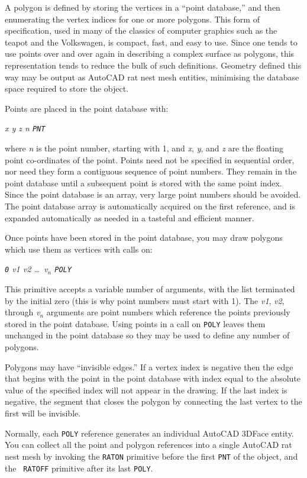 \documentclass{article}
\begin{document}
A polygon is defined by storing the vertices in a ``point database,''
and then enumerating the vertex indices for one or more polygons.
This form of specification, used in many of the classics of computer
graphics such as the teapot and the Volkswagen, is compact, fast, and
easy to use.  Since one tends to use points over and over again in
describing a complex surface as polygons, this representation tends to
reduce the bulk of such definitions.  Geometry defined this way may be
output as AutoCAD rat nest mesh entities, minimising the database
space required to store the object.

Points are placed in the point database with:

{\em x y z n {\tt PNT}}

where {\em n} is the point number, starting with 1, and {\em x}, {\em
y}, and {\em z} are the floating point co-ordinates of the point.
Points need not be specified in sequential order, nor need they form a
contiguous sequence of point numbers. They remain in the point database
until a subsequent point is stored with the same point index.  Since
the point database is an array, very large point numbers should be
avoided.  The point database array is automatically acquired on the
first reference, and is expanded automatically as needed in a tasteful
and efficient manner.

Once points have been stored in the point database, you may draw
polygons which use them as vertices with calls on:

{\em {\tt 0} v1 v2 \ldots\ v$_n$ {\tt POLY}}

This primitive accepts a variable number of arguments, with
the list terminated by the initial zero (this is why point numbers must
start with 1).
The {\em v1}, {\em v2}, through {\em v$_n$} arguments
are point numbers which reference the points previously stored in the
point database.  Using points in a call on {\tt POLY} leaves them
unchanged in the point database so they may be used to define any
number of polygons.

Polygons may have ``invisible edges.''  If a vertex index is negative
then the edge that begins with the point in the point database with
index equal to the absolute value of the specified index will not
appear in the drawing.  If the last index is negative, the segment
that closes the polygon by connecting the last vertex to the first
will be invisible.

Normally, each {\tt POLY} reference generates an individual AutoCAD
3DFace entity.  You can collect all the point and polygon references
into a single AutoCAD rat nest mesh by invoking the {\tt RATON}
primitive before the first {\tt PNT} of the object, and the {\tt
RATOFF} primitive after its last {\tt POLY}\@.
\end{document}

